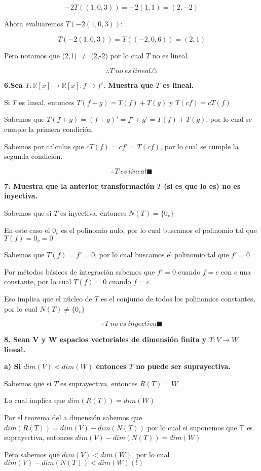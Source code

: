 \documentclass{article}
\begin{document}
$$-2T((1,0,3))=-2(1,1)=(2,-2)$$

Ahora evaluaremos $T(-2(1,0,3))$:

$$T(-2(1,0,3))=T((-2,0,6))=(2,1)$$

Pero notamos que (2,1) $\neq$ (2,-2) por lo cual $T$ no es lineal.

$$\therefore T\ no\ es\ lineal\triangle$$

\pagebreak
\textbf{6.Sea $T: \mathbb{R}[x] \rightarrow \mathbb{R}[x]: f\rightarrow f'$. Muestra que $T$ es lineal.}

Si $T$ es lineal, entonces $T(f+g)=T(f)+T(g)$ y $T(cf)=cT(f)$

Sabemos que $T(f+g)=(f+g)'=f'+g'=T(f)+T(g)$, por lo cual se cumple la primera condición.

Sabemos por calculus que $cT(f)=cf'=T(cf)$, por lo cual se cumple la segunda condición.

$$\therefore T\ es\ lineal\blacksquare$$

\textbf{7. Muestra que la anterior transformación $T$ (si es que lo es) no es inyectiva.}

Sabemos que si $T$ es inyectiva, entonces $N(T)=\{0_{v}\}$

En este caso el $0_{v}$ es el polinomio nulo, por lo cual buscamos el polinomio tal que $T(f)=0_{v}=0$

Sabemos que $T(f)=f'=0$, por lo cual buscamos el polinomio tal que $f'=0$

Por métodos básicos de integración sabemos que $f'=0$ cuando $f=c$ con $c$ una constante, por lo cual $T(f)=0$ cuando $f=c$

Eso implica que el núcleo de $T$ es el conjunto de todos los polinomios constantes, por lo cual $N(T)\neq\{0_{v}\}$

$$\therefore T\ no\ es\ inyectiva\blacksquare$$

\textbf{8. Sean V y W espacios vectoriales de dimensión finita y $T: V \rightarrow W$ lineal.}

\textbf{a) Si $dim(V)<dim(W)$ entonces $T$ no puede ser suprayectiva.}

Sabemos que si $T$ es suprayectiva, entonces $R(T)=W$

Lo cual implica que $dim(R(T))=dim(W)$

Por el teorema del a dimensión sabemos que $dim(R(T)) = dim(V)-dim(N(T))$ por lo cual si suponemos que T es suprayectiva, entonces $dim(V)-dim(N(T))=dim(W)$

Pero sabemos que $dim(V)<dim(W)$, por lo cual $dim(V)-dim(N(T))<dim(W) (!) $
\end{document}
